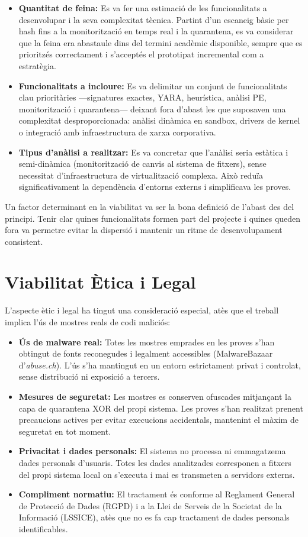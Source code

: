 \documentclass[12pt,a4paper]{report}
\begin{document}
\begin{itemize}
    \item \textbf{Quantitat de feina:} Es va fer una estimació de les funcionalitats a desenvolupar i la seva complexitat tècnica. Partint d'un escaneig bàsic per hash fins a la monitorització en temps real i la quarantena, es va considerar que la feina era abastaule dins del termini acadèmic disponible, sempre que es prioritzés correctament i s'acceptés el prototipat incremental com a estratègia.
    \item \textbf{Funcionalitats a incloure:} Es va delimitar un conjunt de funcionalitats clau prioritàries ---signatures exactes, YARA, heurística, anàlisi PE, monitorització i quarantena--- deixant fora d'abast les que suposaven una complexitat desproporcionada: anàlisi dinàmica en sandbox, drivers de kernel o integració amb infraestructura de xarxa corporativa.
    \item \textbf{Tipus d'anàlisi a realitzar:} Es va concretar que l'anàlisi seria estàtica i semi-dinàmica (monitorització de canvis al sistema de fitxers), sense necessitat d'infraestructura de virtualització complexa. Això reduïa significativament la dependència d'entorns externs i simplificava les proves.
\end{itemize}

Un factor determinant en la viabilitat va ser la bona definició de l'abast des del principi. Tenir clar quines funcionalitats formen part del projecte i quines queden fora va permetre evitar la dispersió i mantenir un ritme de desenvolupament consistent.

\section{Viabilitat Ètica i Legal}
L'aspecte ètic i legal ha tingut una consideració especial, atès que el treball implica l'ús de mostres reals de codi maliciós:

\begin{itemize}
    \item \textbf{Ús de malware real:} Totes les mostres emprades en les proves s'han obtingut de fonts reconegudes i legalment accessibles (MalwareBazaar d'\textit{abuse.ch}). L'ús s'ha mantingut en un entorn estrictament privat i controlat, sense distribució ni exposició a tercers.
    \item \textbf{Mesures de seguretat:} Les mostres es conserven ofuscades mitjançant la capa de quarantena XOR del propi sistema. Les proves s'han realitzat prenent precaucions actives per evitar execucions accidentals, mantenint el màxim de seguretat en tot moment.
    \item \textbf{Privacitat i dades personals:} El sistema no processa ni emmagatzema dades personals d'usuaris. Totes les dades analitzades corresponen a fitxers del propi sistema local on s'executa i mai es transmeten a servidors externs.
    \item \textbf{Compliment normatiu:} El tractament és conforme al Reglament General de Protecció de Dades (RGPD) i a la Llei de Serveis de la Societat de la Informació (LSSICE), atès que no es fa cap tractament de dades personals identificables.
\end{itemize}
\end{document}
